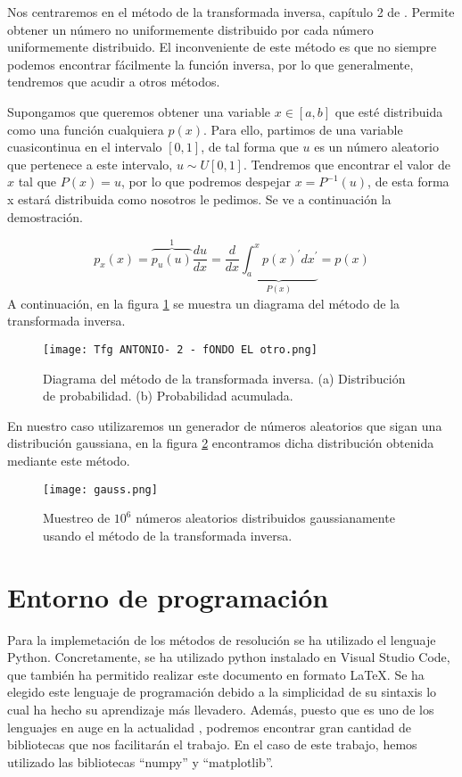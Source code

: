Nos centraremos en el método de la transformada inversa, capítulo 2 de \cite{Toral}. Permite obtener un número no uniformemente distribuido por cada número uniformemente
distribuido. El inconveniente de este método es que no siempre podemos encontrar fácilmente la función inversa, por lo que generalmente, tendremos 
que acudir a otros métodos.

Supongamos que queremos obtener una variable $x \in [a,b]$ que esté distribuida como una función cualquiera $p(x)$. Para ello, partimos de una variable cuasicontinua en el intervalo $[0,1]$, de tal forma que $u$ es un número aleatorio que pertenece a este intervalo,
$u\sim U[0,1]$. Tendremos que encontrar el valor de $x$ tal que $P(x)=u$, por lo que podremos despejar $x=P^{-1}(u)$, de esta forma x estará distribuida
como nosotros le pedimos. Se ve a continuación la demostración.

$$p_x(x)=\overbrace{p_u(u)}^{1}\dfrac{du}{dx}=\dfrac{d}{dx}\underbrace{\int_{a}^{x}p(x)^{\prime}dx^{\prime}}_{P(x)}=p(x)$$
A continuación, en la figura \ref{f:diagrama transformada inversa} se muestra un diagrama del método de la transformada inversa.

\begin{figure}[H]
    \centering
    \texttt{[image: Tfg ANTONIO- 2 - fONDO EL otro.png]}
    \caption{Diagrama del método de la transformada inversa. (a) Distribución de probabilidad. (b) Probabilidad acumulada.}
    \label{f:diagrama transformada inversa}
\end{figure}
\newpage
En nuestro caso utilizaremos un generador de números aleatorios que sigan una distribución gaussiana, en la figura \ref{f:gauss} 
encontramos dicha distribución obtenida mediante este método.

\begin{figure}[H]
    \centering
    \texttt{[image: gauss.png]}
    \caption{Muestreo de $10^6$ números aleatorios distribuidos gaussianamente usando el método de la transformada inversa.}
    \label{f:gauss}
\end{figure}



\section{Entorno de programación}

Para la implemetación de los métodos de resolución se ha utilizado el lenguaje Python. Concretamente, se ha utilizado python instalado en Visual Studio Code, que también
ha permitido realizar este documento en formato \LaTeX. Se ha elegido este lenguaje de programación debido a la simplicidad de su sintaxis
lo cual ha hecho su aprendizaje más llevadero. Además, puesto que es uno de los lenguajes en auge en la actualidad \cite{github}, podremos encontrar gran cantidad
de bibliotecas que nos facilitarán el trabajo. En el caso de este trabajo, hemos utilizado las bibliotecas ``numpy'' y ``matplotlib''.

